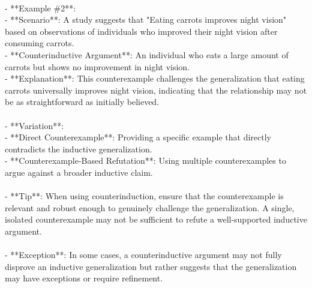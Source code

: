 \documentclass[a4paper,12pt,single,pdftex]{scrbook}
\begin{document}
    \\

    
      - **Example \#2**:
    \\

    
        - **Scenario**: A study suggests that "Eating carrots improves night vision" based on observations of individuals who improved their night vision after consuming carrots.
    \\

    
        - **Counterinductive Argument**: An individual who eats a large amount of carrots but shows no improvement in night vision.
    \\

    
        - **Explanation**: This counterexample challenges the generalization that eating carrots universally improves night vision, indicating that the relationship may not be as straightforward as initially believed.
    \\

    
      
    \\

    
      - **Variation**:
    \\

    
        - **Direct Counterexample**: Providing a specific example that directly contradicts the inductive generalization.
    \\

    
        - **Counterexample-Based Refutation**: Using multiple counterexamples to argue against a broader inductive claim.
    \\

    
      
    \\

    
      - **Tip**: When using counterinduction, ensure that the counterexample is relevant and robust enough to genuinely challenge the generalization. A single, isolated counterexample may not be sufficient to refute a well-supported inductive argument.
    \\

    
      
    \\

    
      - **Exception**: In some cases, a counterinductive argument may not fully disprove an inductive generalization but rather suggests that the generalization may have exceptions or require refinement.
    \\
\end{document}
